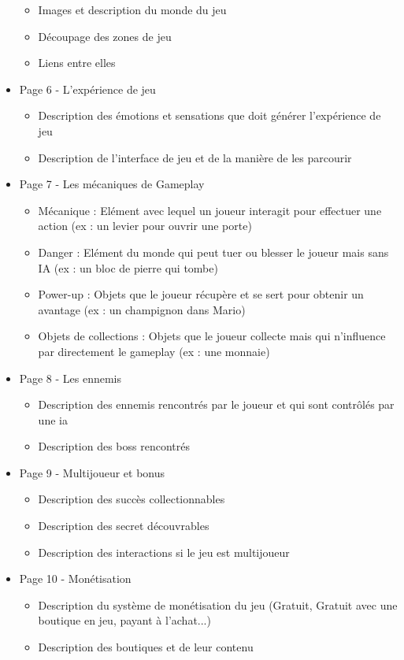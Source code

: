 \begin{itemize}
    \begin{itemize}
        \item Images et description du monde du jeu
        \item Découpage des zones de jeu
        \item Liens entre elles
    \end{itemize}
    \item Page 6 - L'expérience de jeu
    \begin{itemize}
        \item Description des émotions et sensations que doit générer l'expérience de jeu
        \item Description de l'interface de jeu et de la manière de les parcourir
    \end{itemize}
    \item Page 7 - Les mécaniques de Gameplay
    \begin{itemize}
        \item Mécanique : Elément avec lequel un joueur interagit pour effectuer une action (ex : un levier pour ouvrir une porte)
        \item Danger : Elément du monde qui peut tuer ou blesser le joueur mais sans IA (ex : un bloc de pierre qui tombe)
        \item Power-up : Objets que le joueur récupère et se sert pour obtenir un avantage (ex : un champignon dans Mario)
        \item Objets de collections : Objets que le joueur collecte mais qui n'influence par directement le gameplay (ex : une monnaie)
    \end{itemize}
    \item Page 8 - Les ennemis
    \begin{itemize}
        \item Description des ennemis rencontrés par le joueur et qui sont contrôlés par une \gls{ia}
        \item Description des boss rencontrés
    \end{itemize}
    \item Page 9 - Multijoueur et bonus
    \begin{itemize}
        \item Description des succès collectionnables
        \item Description des secret découvrables
        \item Description des interactions si le jeu est multijoueur
    \end{itemize}
    \item Page 10 - Monétisation
    \begin{itemize}
        \item Description du système de monétisation du jeu (Gratuit, Gratuit avec une boutique en jeu, payant à l'achat...)
        \item Description des boutiques et de leur contenu
    \end{itemize}
\end{itemize}




